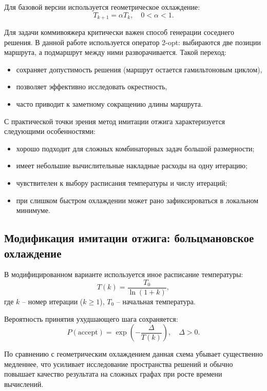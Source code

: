 \documentclass[12pt,a4paper]{article}
\begin{document}
Для базовой версии используется геометрическое охлаждение:
\begin{equation}
T_{k+1} = \alpha T_k, \quad 0<\alpha<1.
\end{equation}

Для задачи коммивояжера критически важен способ генерации соседнего решения.
В данной работе используется оператор 2-opt: выбираются две позиции маршрута, а
подмаршрут между ними разворачивается. Такой переход:
\begin{itemize}
    \item сохраняет допустимость решения (маршрут остается гамильтоновым циклом),
    \item позволяет эффективно исследовать окрестность,
    \item часто приводит к заметному сокращению длины маршрута.
\end{itemize}

С практической точки зрения метод имитации отжига характеризуется следующими
особенностями:
\begin{itemize}
    \item хорошо подходит для сложных комбинаторных задач большой размерности;
    \item имеет небольшие вычислительные накладные расходы на одну итерацию;
    \item чувствителен к выбору расписания температуры и числу итераций;
    \item при слишком быстром охлаждении может рано зафиксироваться в локальном минимуме.
\end{itemize}

\subsection{Модификация имитации отжига: больцмановское охлаждение}

В модифицированном варианте используется иное расписание температуры:
\begin{equation}
T(k) = \frac{T_0}{\ln(1+k)},
\end{equation}
где $k$ -- номер итерации ($k \ge 1$), $T_0$ -- начальная температура.

Вероятность принятия ухудшающего шага сохраняется:
\begin{equation}
P(\text{accept}) = \exp\left(-\frac{\Delta}{T(k)}\right), \quad \Delta>0.
\end{equation}

По сравнению с геометрическим охлаждением данная схема убывает существенно медленнее,
что усиливает исследование пространства решений и обычно повышает качество результата
на сложных графах при росте времени вычислений.
\end{document}
